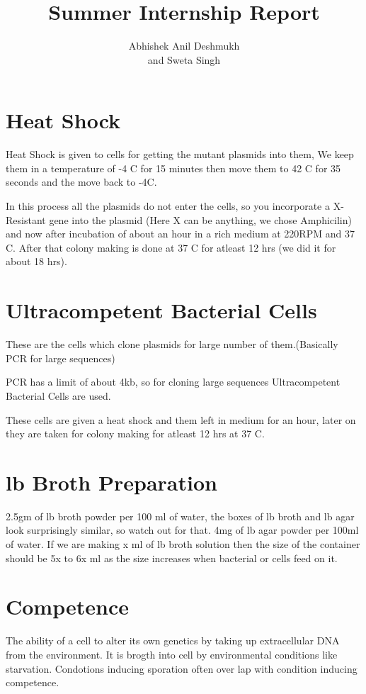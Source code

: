 \documentclass[11pt,twoside,a4paper]{article}
\author{Abhishek Anil Deshmukh\\
	and
	Sweta Singh\\}
\title{Summer Internship Report}
\begin{document}
\maketitle

\section{Heat Shock}
Heat Shock  is given to cells for getting the mutant plasmids into them, We keep them in a temperature of -4 \textdegree C for 15 minutes then move them to 42 \textdegree C for 35 seconds and the move back to -4\textdegree C.

In this process all the plasmids do not enter the cells, so you incorporate a X-Resistant gene into the plasmid (Here X can be anything, we chose Amphicilin) and now after incubation of about an hour in a rich medium at 220RPM and 37 \textdegree C. After that colony making is done at 37 \textdegree C for atleast 12 hrs (we did it for about 18 hrs).

\section{Ultracompetent Bacterial Cells}
These are the cells which clone plasmids for large number of them.(Basically PCR for large sequences)

PCR has a limit of about 4kb, so for cloning large sequences Ultracompetent Bacterial Cells are used.

These cells are given a heat shock and them left in medium for an hour, later on they are taken for colony making for atleast 12 hrs at 37 \textdegree C.
\section{lb Broth Preparation}
2.5gm of lb broth powder per 100 ml of water, the boxes of lb broth and lb agar look surprisingly similar, so watch out for that. 4mg of lb agar powder per 100ml of water. If we are making x ml of lb broth solution then the size of the container should be 5x to 6x ml as the size increases when bacterial or cells feed on it.

\section{Competence}
The ability of a cell to alter its own genetics by taking up extracellular DNA from the environment. It is brogth into cell by environmental conditions like starvation. Condotions inducing sporation often over lap with condition inducing competence.
\end{document}
